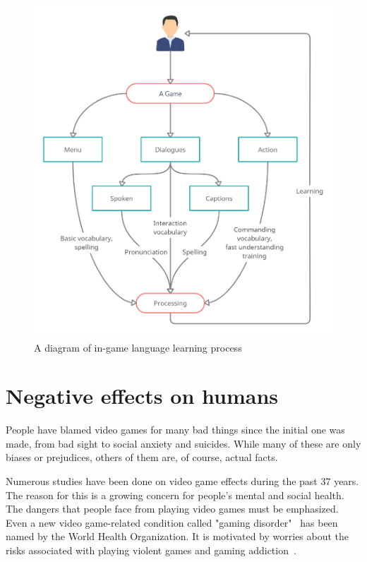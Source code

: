 \documentclass[10pt,twoside,english,a4paper]{article}
\begin{document}
\begin{figure}[h]
\centering
\includegraphics[scale=0.16]{language}
\caption{A diagram of in-game language learning process}
\end{figure}

\section{Negative effects on humans} \label{negative}
People have blamed video games for many bad things since the initial one was made, from bad sight to social anxiety and suicides. While many of these are only biases or prejudices, others of them are, of course, actual facts.

Numerous studies have been done on video game effects during the past 37 years. The reason for this is a growing concern for people's mental and social health. The dangers that people face from playing video games must be emphasized. Even a new video game-related condition called "gaming disorder"~\cite{children,disorder} has been named by the World Health Organization. It is motivated by worries about the risks associated with playing violent games and gaming addiction~\cite{children}.
\end{document}
